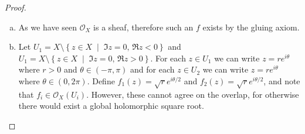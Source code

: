 \documentclass[10pt]{amsart}
\begin{document}
\begin{thm}
  \begin{proof}
    \begin{enumerate}[(a)]
    \item
      As we have seen $\mathcal{O}_X$ is a sheaf, therefore such an $f$ exists by the gluing axiom.
    \item
      Let $U_1 = X \setminus \left\{z \in X \;\middle\vert\; \Im{z} = 0,\, \Re{z} < 0\right\}$ and $U_1 = X \setminus \left\{z \in X \;\middle\vert\; \Im{z} = 0,\, \Re{z} > 0\right\}$.
      For each $z \in U_1$ we can write $z = re^{i\theta}$ where $r > 0$ and $\theta \in (-\pi, \pi)$ and for each $z \in U_2$ we can write $z = re^{i\theta}$ where $\theta \in (0, 2\pi)$.
      Define $f_1(z) = \sqrt{r}e^{i\theta/2}$ and $f_2(z) = \sqrt{r}e^{i\theta/2}$, and note that $f_i \in \mathcal{O}_X(U_i)$.
      However, these cannot agree on the overlap, for otherwise there would exist a global holomorphic square root.
    \end{enumerate}
  \end{proof}
\end{thm}
\end{document}

